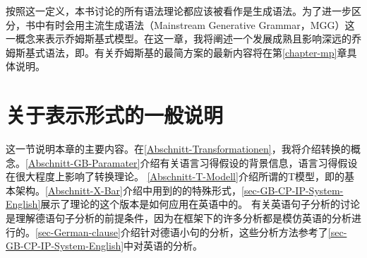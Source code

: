 按照这一定义，本书讨论的所有语法理论都应该被看作是生成语法。为了进一步区分，书中有时会用主流生成语法（Mainstream Generative Grammar，MGG）这一概念\citep[]{CJ2005a}来表示乔姆斯基式模型。在这一章，我将阐述一个发展成熟且影响深远的乔姆斯基式语法，即\gbtc。有关乔姆斯基的最简方案的最新内容将在第\ref{chapter-mp}章具体说明。

\section{关于表示形式的一般说明}
\label{Abschnitt-GB-allgemein}

这一节说明本章的主要内容。在\ref{Abschnitt-Transformationen}，我将介绍转换的概念。\ref{Abschnitt-GB-Paramater}介绍有关语言习得假设的背景信息，语言习得假设在很大程度上影响了转换理论。
\ref{Abschnitt-T-Modell}介绍所谓的T模型，即\gbtc 的基本架构。\ref{Abschnitt-X-Bar}介绍\gbc 中用到的\xbartc 的特殊形式，\ref{sec-GB-CP-IP-System-English}展示了\xbarc 理论的这个版本是如何应用在英语中的。
有关英语句子分析的讨论是理解德语句子分析的前提条件，因为在\gbc 框架下的许多分析都是模仿英语的分析进行的。\ref{sec-German-clause}介绍针对德语小句的分析，这些分析方法参考了\ref{sec-GB-CP-IP-System-English}中对英语的分析。

